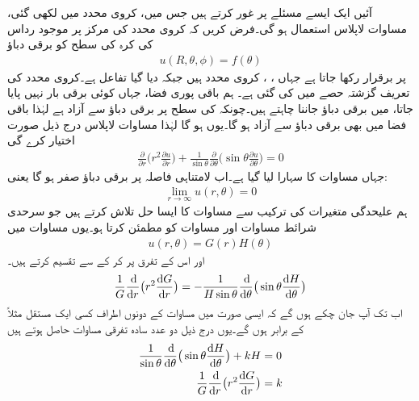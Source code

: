 آئیں ایک ایسے مسئلے پر غور کرتے ہیں جس میں، کروی محدد میں لکھی گئی، مساوات لاپلاس استعمال ہو گی۔فرض کریں کہ کروی محدد کی مرکز پر موجود رداس  کی کرہ  کی سطح کو  برقی دباؤ 
\begin{align}\label{مساوات_جزوی_کرہ_بار_بردار_الف}
u(R,\theta,\phi)=f(\theta)
\end{align}
پر برقرار رکھا جاتا ہے جہاں ، ،  کروی محدد ہیں جبکہ  دیا گیا تفاعل ہے۔کروی محدد کی تعریف گزشتہ حصے میں کی گئی ہے۔ ہم باقی پوری فضا، جہاں کوئی برقی بار نہیں پایا جاتا، میں برقی دباؤ  جاننا چاہتے ہیں۔چونکہ  کی سطح پر برقی دباؤ  سے آزاد ہے لہٰذا باقی فضا میں بھی برقی دباؤ  سے آزاد ہو گا۔یوں  ہو گا لہٰذا مساوات لاپلاس  درج ذیل صورت اختیار کرے گی
\begin{align}\label{مساوات_جزوی_کرہ_بار_بردار_ب}
\frac{\partial}{\partial r}\big(r^2\frac{\partial u}{\partial r}\big)+\frac{1}{\sin \theta}\frac{\partial}{\partial \theta}\big(\sin \theta \frac{\partial u}{\partial \theta}\big)=0
\end{align}
جہاں مساوات  کا سہارا لیا گیا ہے۔اب لامتناہی فاصلہ پر برقی دباؤ صفر ہو گا یعنی:
\begin{align}\label{مساوات_جزوی_کرہ_بار_بردار_پ}
\lim_{r\to\infty} u(r,\theta)=0
\end{align}
ہم علیحدگی متغیرات کی ترکیب سے مساوات  کا ایسا حل تلاش کرتے ہیں جو سرحدی شرائط مساوات  اور مساوات  کو مطمئن کرتا ہو۔یوں مساوات  میں
\begin{align}\label{مساوات_جزوی_کرہ_بار_بردار_ت}
u(r,\theta)=G(r)H(\theta)
\end{align}
اور اس کے تفرق پر کر کے  سے تقسیم کرتے ہیں۔
\begin{align*}
\frac{1}{G}\frac{\dif}{\dif r}\big(r^2\frac{\dif G}{\dif r}\big)=-\frac{1}{H\sin \theta}\frac{\dif}{\dif \theta}\big(\sin \theta \frac{\dif H}{\dif \theta}\big)
\end{align*}
اب تک آپ جان چکے ہوں گے کہ ایسی صورت میں مساوات کے دونوں اطراف کسی ایک مستقل مثلاً  کے برابر ہوں گے۔یوں درج ذیل دو عدد سادہ تفرقی مساوات حاصل ہوتے ہیں
\begin{align}
\frac{1}{\sin\theta}\frac{\dif}{\dif \theta}\big(\sin\theta\frac{\dif H}{\dif \theta}\big)+kH&=0\label{مساوات_جزوی_کرہ_بار_بردار_ٹ}\\
\frac{1}{G}\frac{\dif}{\dif r}\big(r^2\frac{\dif G}{\dif r}\big)&=k\label{مساوات_جزوی_کرہ_بار_بردار_ث}
\end{align}
